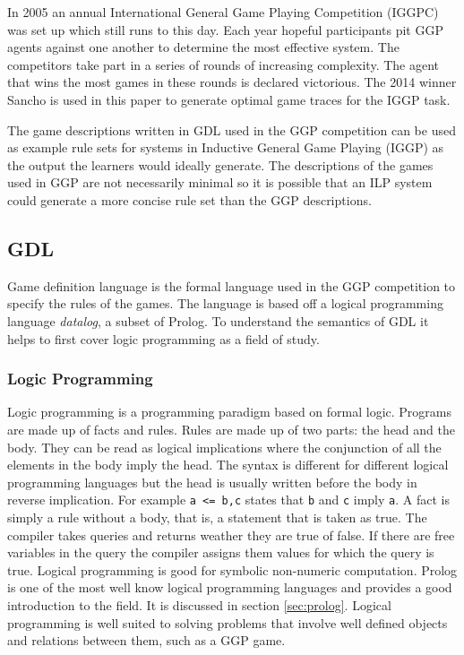 In 2005 an annual International General Game Playing Competition (IGGPC) was set up which still runs to this day\cite{Kowalski/GGP}. Each year hopeful participants pit GGP agents against one another to determine the most effective system. The competitors take part in a series of rounds of increasing complexity. The agent that wins the most games in these rounds is declared victorious. The 2014 winner Sancho is used in this paper to generate optimal game traces for the IGGP task.

The game descriptions written in GDL used in the GGP competition can be used as example rule sets for systems in Inductive General Game Playing (IGGP) as the output the learners would ideally generate. The descriptions of the games used in GGP are not necessarily minimal so it is possible that an ILP system could generate a more concise rule set than the GGP descriptions.

\subsection{GDL}\label{sec:GDL}
Game definition language is the formal language used in the GGP competition to specify the rules of the games\cite{GDL_Spec}. The language is based off a logical programming language \textit{datalog}, a subset of Prolog. To understand the semantics of GDL it helps to first cover logic programming as a field of study.
\subsubsection{Logic Programming}
Logic programming is a programming paradigm based on formal logic. Programs are made up of facts and rules. Rules are made up of two parts: the head and the body. They can be read as logical implications where the conjunction of all the elements in the body imply the head. The syntax is different for different logical programming languages but the head is usually written before the body in reverse implication. For example \texttt{a <= b,c} states that \texttt{b} and \texttt{c} imply \texttt{a}. A fact is simply a rule without a body, that is, a statement that is taken as true. The compiler takes queries and returns weather they are true of false. If there are free variables in the query the compiler assigns them values for which the query is true. Logical programming is good for symbolic non-numeric computation\cite{Bratko}. Prolog is one of the most well know logical programming languages\cite{SWIPL} and provides a good introduction to the field. It is discussed in section \ref{sec:prolog}. Logical programming is well suited to solving problems that involve well defined objects and relations between them, such as a GGP game.
